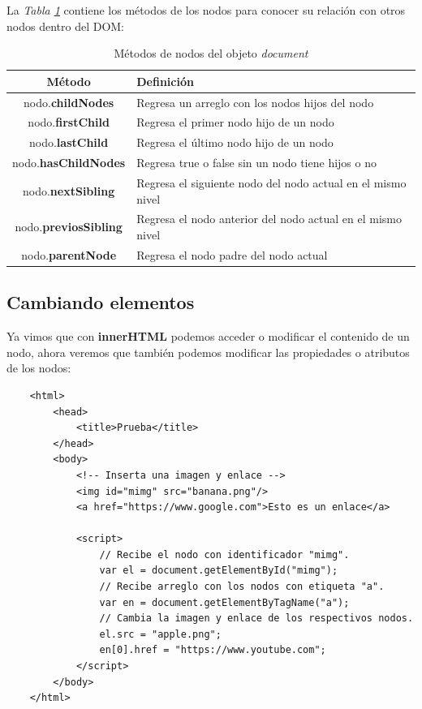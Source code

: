 La \textit{Tabla \ref{tab: 9}} contiene los métodos de los nodos para conocer su relación con otros nodos dentro del DOM:
\begin{table}[H]
    \begin{center}
        \caption{Métodos de nodos del objeto \textit{document}}
        \label{tab: 9}
        \begin{tabular}{c l}
            \hline
            \textbf{Método}&\textbf{Definición} \\
            \hline
            nodo.\textbf{childNodes}        & Regresa un arreglo con los nodos hijos del nodo \\
            nodo.\textbf{firstChild}        & Regresa el primer nodo hijo de un nodo \\
            nodo.\textbf{lastChild}         & Regresa el último nodo hijo de un nodo \\
            nodo.\textbf{hasChildNodes}     & Regresa true o false sin un nodo tiene hijos o no \\
            nodo.\textbf{nextSibling}       & Regresa el siguiente nodo del nodo actual en el mismo nivel \\
            nodo.\textbf{previosSibling}    & Regresa el nodo anterior del nodo actual en el mismo nivel \\
            nodo.\textbf{parentNode}        & Regresa el nodo padre del nodo actual \\
            \hline
        \end{tabular}
    \end{center}
\end{table}


\subsection{Cambiando elementos}
\hspace{0.55cm}Ya vimos que con \textbf{innerHTML} podemos acceder o modificar el contenido de un nodo, ahora veremos que también podemos modificar las propiedades o atributos de los nodos:
\begin{lstlisting}
    <html>
        <head>
            <title>Prueba</title>
        </head>
        <body>
            <!-- Inserta una imagen y enlace -->
            <img id="mimg" src="banana.png"/>
            <a href="https://www.google.com">Esto es un enlace</a>
            
            <script>
                // Recibe el nodo con identificador "mimg".
                var el = document.getElementById("mimg");
                // Recibe arreglo con los nodos con etiqueta "a".
                var en = document.getElementByTagName("a");
                // Cambia la imagen y enlace de los respectivos nodos.
                el.src = "apple.png";
                en[0].href = "https://www.youtube.com";
            </script>
        </body>
    </html>
\end{lstlisting}

